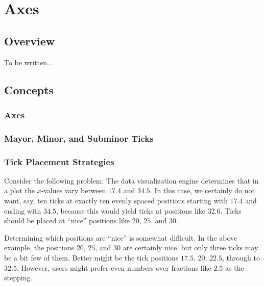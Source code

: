%
%
%


\section{Axes}
\label{section-dv-axes}

\subsection{Overview}

To be written...


\subsection{Concepts}

\subsubsection{Axes}

\subsubsection{Mayor, Minor, and Subminor Ticks}

\subsubsection{Tick Placement Strategies}
\label{section-dv-concept-tick-placement-strategies}

Consider the following problem: The data visualization engine
determines that in a
plot the $x$-values vary between $17.4$ and $34.5$. In this case, we
certainly do not want, say, ten ticks at exactly ten evenly spaced
positions starting with $17.4$ and ending with $34.5$, because this
would yield ticks at positions like $32.6$. Ticks should be placed at
``nice'' positions like $20$, $25$, and $30$.

Determining which positions are ``nice'' is somewhat difficult. In the
above example, the positions $20$, $25$, and $30$ are certainly nice,
but only three ticks may be a bit few of them. Better might be the
tick positions $17.5$, $20$, $22.5$, through to $32.5$. However, users
might prefer even numbers over fractions like $2.5$ as the stepping.

